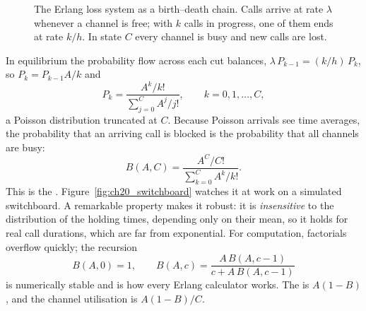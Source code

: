 \begin{figure}[htbp]\centering
{}
\caption{The Erlang loss system as a birth--death chain. Calls arrive at rate $\lambda$ whenever a channel is
free; with $k$ calls in progress, one of them ends at rate $k/h$. In state $C$ every channel is busy and new
calls are lost.}
\label{fig:ch20_birthdeath}
\end{figure}

In equilibrium the probability flow across each cut balances,
$\lambda\,P_{k-1}=(k/h)\,P_k$, so $P_k=P_{k-1}A/k$ and
\begin{equation}
P_k=\frac{A^k/k!}{\sum_{j=0}^{C}A^j/j!},\qquad k=0,1,\dots,C,
\end{equation}
a Poisson distribution truncated at $C$. Because Poisson arrivals see time averages, the probability that an arriving
call is blocked is the probability that all channels are busy:
\begin{equation}
B(A,C)=\frac{A^C/C!}{\sum_{k=0}^{C}A^k/k!}.
\label{eq:ch20:erlangb}
\end{equation}
This is the . Figure~\ref{fig:ch20_switchboard} watches it at work on a simulated
switchboard. A remarkable property makes it robust: it is \emph{insensitive} to the
distribution of the holding times, depending only on their mean, so it holds for real call durations, which are far
from exponential. For computation, factorials overflow quickly; the recursion
\begin{equation}
B(A,0)=1,\qquad B(A,c)=\frac{A\,B(A,c-1)}{c+A\,B(A,c-1)}
\label{eq:ch20:erlangbrec}
\end{equation}
is numerically stable and is how every Erlang calculator works. The  is $A(1-B)$, and the
channel utilisation is $A(1-B)/C$.

